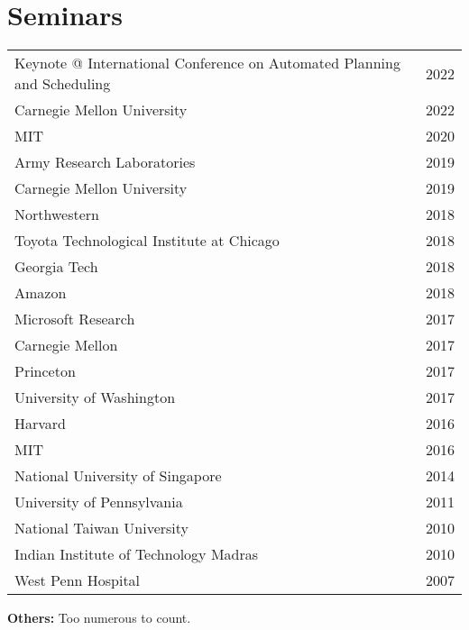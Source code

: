 
\section{Seminars}
\begin{center}
\begin{tabularx}{\linewidth}{Xr}
Keynote @ International Conference on Automated Planning and Scheduling & 2022\\
Carnegie Mellon University & 2022\\
MIT & 2020\\
Army Research Laboratories & 2019\\
Carnegie Mellon University & 2019\\
Northwestern & 2018\\
Toyota Technological Institute at Chicago & 2018\\
Georgia Tech & 2018\\
Amazon & 2018\\
Microsoft Research & 2017\\
Carnegie Mellon & 2017\\
Princeton & 2017\\
University of Washington & 2017\\
Harvard & 2016\\
MIT & 2016\\
National University of Singapore & 2014\\
University of Pennsylvania & 2011\\
National Taiwan University & 2010\\
Indian Institute of Technology Madras & 2010\\
West Penn Hospital & 2007
\end{tabularx}
\end{center}
\noindent \textbf{Others:} Too numerous to count.
